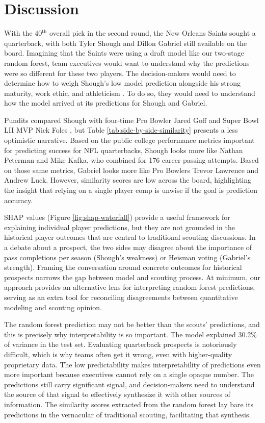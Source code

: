 \documentclass[Review, sageh, times, doublespace]{sagej}
\newcommand{\revision}[1]{{\color{orange} #1}}
\begin{document}
\section{Discussion}
\label{sec:discussion}

  With the 40$^\text{th}$ overall pick in the second round, the New Orleans Saints sought a quarterback, with both Tyler Shough and Dillon Gabriel still available on the board. Imagining that the Saints were using a draft model like our two-stage random forest, team executives would want to understand why the predictions were so different for these two players. The decision-makers would need to determine how to weigh Shough's low model prediction alongside his strong maturity, work ethic, and athleticism \citep{mcgavic_tyler_2025}. To do so, they would need to understand how the model arrived at its predictions for Shough and Gabriel.

  Pundits compared Shough with four-time Pro Bowler Jared Goff \citep{campbell_2025_2025} and Super Bowl LII MVP Nick Foles \citep{richard_tyler_2025}, but Table \ref{tab:side-by-side-similarity} presents a less optimistic narrative. Based on the public college performance metrics important for predicting success for NFL quarterbacks, Shough looks more like Nathan Peterman and Mike Kafka, who combined for 176 career passing attempts. Based on those same metrics, Gabriel looks more like Pro Bowlers Trevor Lawrence and Andrew Luck. However, similarity scores are low across the board, highlighting the insight that relying on a single player comp is unwise if the goal is prediction accuracy.
  
  \revision{
    SHAP values (Figure \ref{fig:shap-waterfall}) provide a useful framework for explaining individual player predictions, but they are not grounded in the historical player outcomes that are central to traditional scouting discussions. In a debate about a prospect, the two sides may disagree about the importance of pass completions per season (Shough's weakness) or Heisman voting (Gabriel's strength). Framing the conversation around concrete outcomes for historical prospects narrows the gap between model and scouting process. At minimum, our approach provides an alternative lens for interpreting random forest predictions, serving as an extra tool for reconciling disagreements between quantitative modeling and scouting opinion.
  }

  The random forest prediction may not be better than the scouts' predictions, and this is precisely why interpretability is so important. The model explained \revision{30.2\%} of variance in the test set. Evaluating quarterback prospects is notoriously difficult, which is why teams often get it wrong, even with higher-quality proprietary data. The low predictability makes interpretability of predictions even more important because executives cannot rely on a single opaque number. The predictions still carry significant signal, and decision-makers need to understand the source of that signal to effectively synthesize it with other sources of information. The similarity scores extracted from the random forest lay bare its predictions in the vernacular of traditional scouting, facilitating that synthesis.
\end{document}
